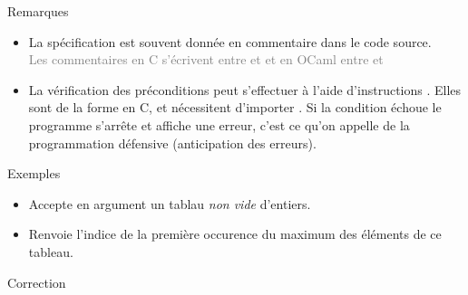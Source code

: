 \documentclass[10pt]{beamer}
\begin{document}
\begin{frame}{\Ctitle}{\stitle}
\begin{block}{Remarques}
\begin{itemize}
\item<1-> La spécification est souvent donnée en commentaire dans le code source. \\
 \textcolor{gray}{Les commentaires en C s'écrivent entre \kw{/*} et \kw{*/} et en OCaml entre \kw{(*} et \kw{*)}}
\item<3-> La vérification des préconditions peut s'effectuer à l'aide d'instructions . Elles sont de la forme  en C, et nécessitent d'importer . Si la condition échoue le programme s'arrête et affiche une erreur, c'est ce qu'on appelle de la programmation défensive (anticipation des erreurs).
\end{itemize}
\end{block}
\begin{exampleblock}{Exemples}
\begin{itemize}
	\item<5-> Accepte en argument un tablau \textit{non vide} d'entiers.
	\item<6-> Renvoie l'indice de la première occurence du maximum des éléments de ce tableau.
\end{itemize}
\end{exampleblock}
\end{frame}


\begin{frame}{\Ctitle}{\stitle}
	\begin{exampleblock}{Correction}
	\end{exampleblock}
\end{frame}
\end{document}
